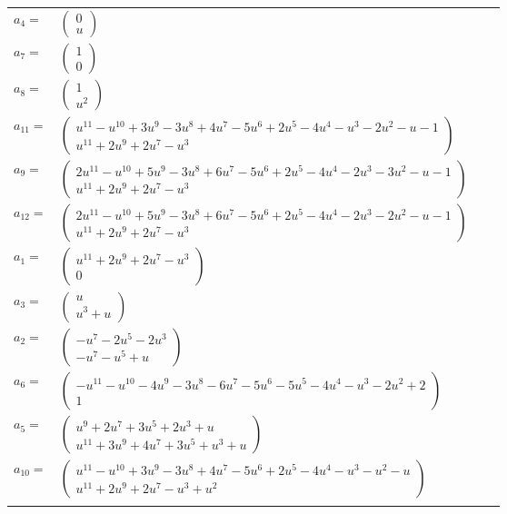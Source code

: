 \documentclass[1p]{elsarticle_modified}
\theoremstyle{definition}
\begin{document}
\begin{tabular}{m{7pt} m{180pt} m{7pt} m{180pt} }
\flushright $a_{4}=$&$\begin{pmatrix}0\\u\end{pmatrix}$ \\
\flushright $a_{7}=$&$\begin{pmatrix}1\\0\end{pmatrix}$ \\
\flushright $a_{8}=$&$\begin{pmatrix}1\\u^2\end{pmatrix}$ \\
\flushright $a_{11}=$&$\begin{pmatrix}u^{11}- u^{10}+3 u^9-3 u^8+4 u^7-5 u^6+2 u^5-4 u^4- u^3-2 u^2- u-1\\u^{11}+2 u^9+2 u^7- u^3\end{pmatrix}$ \\
\flushright $a_{9}=$&$\begin{pmatrix}2 u^{11}- u^{10}+5 u^9-3 u^8+6 u^7-5 u^6+2 u^5-4 u^4-2 u^3-3 u^2- u-1\\u^{11}+2 u^9+2 u^7- u^3\end{pmatrix}$ \\
\flushright $a_{12}=$&$\begin{pmatrix}2 u^{11}- u^{10}+5 u^9-3 u^8+6 u^7-5 u^6+2 u^5-4 u^4-2 u^3-2 u^2- u-1\\u^{11}+2 u^9+2 u^7- u^3\end{pmatrix}$ \\
\flushright $a_{1}=$&$\begin{pmatrix}u^{11}+2 u^9+2 u^7- u^3\\0\end{pmatrix}$ \\
\flushright $a_{3}=$&$\begin{pmatrix}u\\u^3+u\end{pmatrix}$ \\
\flushright $a_{2}=$&$\begin{pmatrix}- u^7-2 u^5-2 u^3\\- u^7- u^5+u\end{pmatrix}$ \\
\flushright $a_{6}=$&$\begin{pmatrix}- u^{11}- u^{10}-4 u^9-3 u^8-6 u^7-5 u^6-5 u^5-4 u^4- u^3-2 u^2+2\\1\end{pmatrix}$ \\
\flushright $a_{5}=$&$\begin{pmatrix}u^9+2 u^7+3 u^5+2 u^3+u\\u^{11}+3 u^9+4 u^7+3 u^5+u^3+u\end{pmatrix}$ \\
\flushright $a_{10}=$&$\begin{pmatrix}u^{11}- u^{10}+3 u^9-3 u^8+4 u^7-5 u^6+2 u^5-4 u^4- u^3- u^2- u\\u^{11}+2 u^9+2 u^7- u^3+u^2\end{pmatrix}$\\&\end{tabular}
\end{document}
